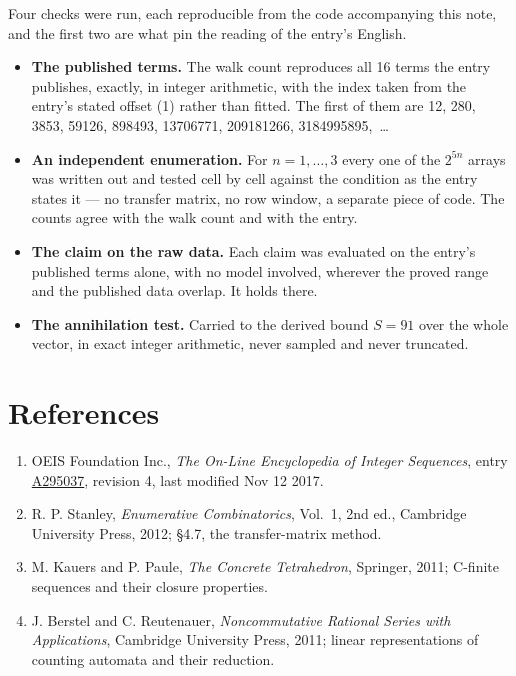 \documentclass[11pt]{article}
\theoremstyle{definition}
\begin{document}
Four checks were run, each reproducible from the code accompanying this note, and the first two are what pin the reading of the entry's English.

\begin{itemize}

\item {\bfseries The published terms.} The walk count reproduces all 16 terms the entry publishes, exactly, in integer arithmetic, with the index taken from the entry's stated offset (1) rather than fitted. The first of them are 12, 280, 3853, 59126, 898493, 13706771, 209181266, 3184995895,~\dots

\item {\bfseries An independent enumeration.} For $n = 1,\dots,3$ every one of the $2^{5n}$ arrays was written out and tested cell by cell against the condition as the entry states it --- no transfer matrix, no row window, a separate piece of code. The counts agree with the walk count and with the entry.

\item {\bfseries The claim on the raw data.} Each claim was evaluated on the entry's published terms alone, with no model involved, wherever the proved range and the published data overlap. It holds there.

\item {\bfseries The annihilation test.} Carried to the derived bound $S = 91$ over the whole vector, in exact integer arithmetic, never sampled and never truncated.

\end{itemize}

\section{References}

\begin{enumerate}

\item OEIS Foundation Inc., \emph{The On-Line Encyclopedia of Integer Sequences}, entry \href{https://oeis.org/A295037}{A295037}, revision 4, last modified Nov 12 2017.

\item R. P. Stanley, \emph{Enumerative Combinatorics}, Vol.~1, 2nd ed., Cambridge University Press, 2012; \S4.7, the transfer-matrix method.

\item M. Kauers and P. Paule, \emph{The Concrete Tetrahedron}, Springer, 2011; C-finite sequences and their closure properties.

\item J. Berstel and C. Reutenauer, \emph{Noncommutative Rational Series with Applications}, Cambridge University Press, 2011; linear representations of counting automata and their reduction.

\end{enumerate}
\end{document}
